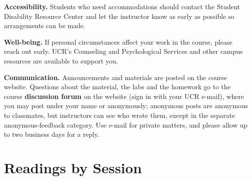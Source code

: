 \documentclass[11pt]{article}
\begin{document}
\textbf{Accessibility.} Students who need accommodations should contact the Student Disability Resource Center and let the instructor know as early as possible so arrangements can be made.

\textbf{Well-being.} If personal circumstances affect your work in the course, please reach out early. UCR's Counseling and Psychological Services and other campus resources are available to support you.

\textbf{Communication.} Announcements and materials are posted on the course website. Questions about the material, the labs and the homework go to the course \textbf{discussion forum} on the website (sign in with your UCR e-mail), where you may post under your name or anonymously; anonymous posts are anonymous to classmates, but instructors can see who wrote them, except in the separate anonymous-feedback category. Use e-mail for private matters, and please allow up to two business days for a reply.

\section{Readings by Session}\label{sec:readings}
\end{document}
